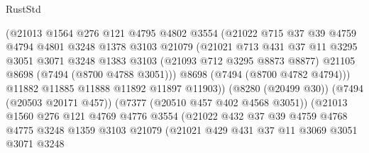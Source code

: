 \begin{lexlean}{RustStd}
\begin{coremodule}
                          (@21013
                            @1564
                            @276
                            @121
                            @4795
                            @4802
                            @3554
                            (@21022
                              @715
                              @37
                              @39
                              @4759
                              @4794
                              @4801
                              @3248
                              @1378
                              @3103
                              @21079
                              (@21021
                                @713
                                @431
                                @37
                                @11
                                @3295
                                @3051
                                @3071
                                @3248
                                @1383
                                @3103
                                (@21093 @712 @3295 @8873 @8877)
                                @21105
                                @8698
                                (@7494 (@8700 @4788 @3051)))
                              @8698
                              (@7494 (@8700 @4782 @4794)))
                            @11882
                            @11885
                            @11888
                            @11892
                            @11897
                            @11903))
                        (@8280 (@20499 @30))
                        (@7494 (@20503 @20171 @457))
                        (@7377 (@20510 @457 @402 @4568 @3051))
                        (@21013
                          @1560
                          @276
                          @121
                          @4769
                          @4776
                          @3554
                          (@21022
                            @432
                            @37
                            @39
                            @4759
                            @4768
                            @4775
                            @3248
                            @1359
                            @3103
                            @21079
                            (@21021
                              @429
                              @431
                              @37
                              @11
                              @3069
                              @3051
                              @3071
                              @3248

\end{coremodule}
\end{lexlean}
